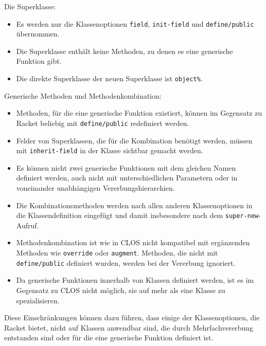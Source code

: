 Die Superklasse:
\begin{itemize}
 \item Es werden nur die Klassenoptionen \texttt{field}, \texttt{init-field} und \texttt{define/public} übernommen.
 \item Die Superklasse enthält keine Methoden, zu denen es eine generische Funktion gibt.
 \item Die direkte Superklasse der neuen Superklasse ist \texttt{object\%}.
\end{itemize}

Generische Methoden und Methodenkombination:
\begin{itemize}
 \item Methoden, für die eine generische Funktion existiert, können im Gegensatz zu Racket beliebig mit \texttt{define/public} redefiniert werden.
 \item Felder von Superklassen, die für die Kombination benötigt werden, müssen mit \texttt{inherit-field} in der Klasse sichtbar gemacht werden.
 \item Es können nicht zwei generische Funktionen mit dem gleichen Namen definiert werden, auch nicht mit unterschiedlichen Parametern oder in voneinander unabhängigen Vererbungshierarchien.
 \item Die Kombinationsmethoden werden nach allen anderen Klassenoptionen in die Klassendefinition eingefügt und damit insbesondere nach dem \texttt{super-new}-Aufruf.
 \item Methodenkombination ist wie in CLOS nicht kompatibel mit ergänzenden Methoden wie \texttt{override} oder \texttt{augment}. Methoden, die nicht mit \texttt{define/public} definiert wurden, werden bei der Vererbung ignoriert.
 \item Da generische Funktionen innerhalb von Klassen definiert werden, ist es im Gegensatz zu CLOS nicht möglich, sie auf mehr als eine Klasse zu spezialisieren.
\end{itemize}

Diese Einschränkungen können dazu führen, dass einige der Klassenoptionen, die Racket bietet, nicht auf Klassen anwendbar sind, die durch Mehrfachvererbung entstanden sind oder für die eine generische Funktion definiert ist.

